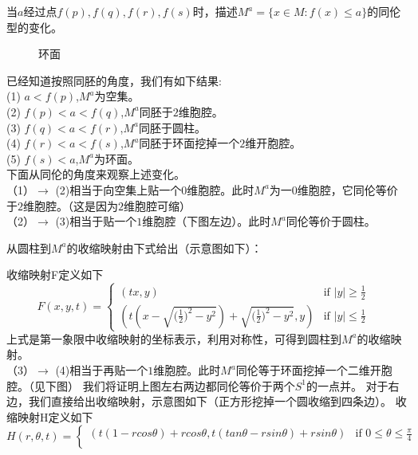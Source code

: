 \documentclass[a4paper]{ctexart}
\begin{document}
\begin{theorem}当$a$经过点$f(p),f(q),f(r),f(s)$时，描述$M^a=\{x \in M : f(x) \leqslant a\}$的同伦型的变化。
\begin{figure}[H]
\small
\centering
环面{}
\label{2}
\end{figure}
已经知道按照同胚的角度，我们有如下结果: \\
(1) $a<f(p)$,$M^a$为空集。\\
(2) $f(p)<a<f(q)$,$M^a$同胚于$2$维胞腔。\\
(3) $f(q)<a<f(r)$,$M^a$同胚于圆柱。\\
(4) $f(r)<a<f(s)$,$M^a$同胚于环面挖掉一个$2$维开胞腔。\\
(5) $f(s)<a$,$M^a$为环面。\\
下面从同伦的角度来观察上述变化。\\
（1）$\to$ (2)相当于向空集上贴一个$0$维胞腔。此时$M^a$为一$0$维胞腔，它同伦等价于$2$维胞腔。（这是因为$2$维胞腔可缩）\\
（2）$\to$ (3)相当于贴一个$1$维胞腔（下图左边）。此时$M^a$同伦等价于圆柱。
\begin{figure}[H]
\small
\centering
{}
\label{2}
\end{figure}
从圆柱到$M^a$的收缩映射由下式给出（示意图如下）：    
\begin{figure}[H]
\small
\centering
{}
\label{2}
\end{figure}
收缩映射F定义如下
\begin{equation}
F(x,y,t)=
\begin{cases}
(tx,y) &\mbox{if $|y|\geqslant \frac{1}{2}$}\\
(t(x-\sqrt{{(\frac{1}{2}})^2-y^2})+\sqrt{{(\frac{1}{2}})^2-y^2},y) &\mbox{if $|y|\leqslant \frac{1}{2}$ }
\end{cases}
\end{equation}
上式是第一象限中收缩映射的坐标表示，利用对称性，可得到圆柱到$M^a$的收缩映射。\\
（3）$\to$ (4)相当于再贴一个$1$维胞腔。此时$M^a$同伦等于环面挖掉一个二维开胞腔。（见下图）
我们将证明上图左右两边都同伦等价于两个$S^1$的一点并。
对于右边，我们直接给出收缩映射，示意图如下（正方形挖掉一个圆收缩到四条边）。
收缩映射H定义如下
\begin{equation}
H(r,\theta,t)=
\begin{cases}
(t(1-rcos\theta)+rcos\theta,t(tan\theta-rsin\theta)+rsin\theta) &\mbox{if $0\leqslant \theta \leqslant \frac{\pi}{4}$}\\

\end{cases}
\end{equation}
\end{theorem}
\end{document}
